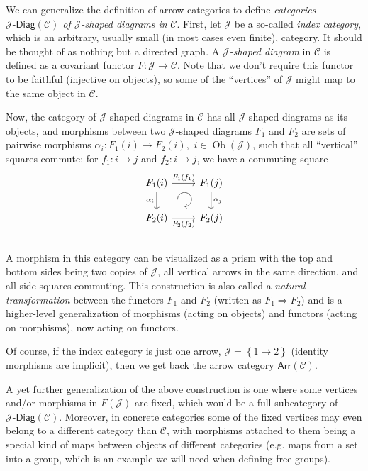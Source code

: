 \documentclass[english,letterpaper]{article}%
\numberwithin{equation}{section}
\numberwithin{figure}{section}
\numberwithin{table}{section}
\theoremstyle{definition}
\theoremstyle{definition}
\theoremstyle{definition}
\theoremstyle{plain}
\theoremstyle{plain}
\theoremstyle{plain}
\theoremstyle{plain}
\theoremstyle{remark}
\theoremstyle{remark}
\DeclareMathOperator{\ob}{Ob}
\begin{document}
\begin{defn}\label{categories of diagrams}
We can generalize the definition of arrow categories to define \emph{categories
$\mathcal{J}\text{-}\mathsf{Diag}\left(\mathcal{C}\right)$ of $\mathcal{J}$-shaped
diagrams in} $\mathcal{C}$. First, let $\mathcal{J}$ be a so-called \emph{index
category}, which is an arbitrary, usually small (in most cases even finite), category.
It should be thought of as nothing but a directed graph. A \emph{$\mathcal{J}$-shaped
diagram} in $\mathcal{C}$ is defined as a covariant functor $F:\mathcal{J}\to\mathcal{C}$.
Note that we don't require this functor to be faithful (injective
on objects), so some of the ``vertices'' of $\mathcal{J}$ might
map to the same object in $\mathcal{C}$.

Now, the category of $\mathcal{J}$-shaped diagrams in $\mathcal{C}$
has all $\mathcal{J}$-shaped diagrams as its objects, and morphisms
between two $\mathcal{J}$-shaped diagrams $F_{1}$ and $F_{2}$ are
sets of pairwise morphisms $\alpha_{i}:F_{1}\left(i\right)\to F_{2}\left(i\right),$
$i\in\ob\left(\mathcal{J}\right)$, such that all ``vertical'' squares
commute: for $f_{1}:i\to j$ and $f_{2}:i\to j$, we have a commuting
square\[\begin{tikzcd}[every matrix/.append style={name=m},   
execute at end picture={\draw [<-] ([xshift=-2.7em,yshift=.3em]m-2-2.north) arc[start angle=-90,delta angle=270,radius=0.25cm];}]
   F_1(i)\arrow[r,"F_1(f_1)" ]\arrow[d,swap,"\alpha_i" ]& F_1(j) \arrow[d,"\alpha_j" ] \\
   F_2(i)\arrow[r,swap,"F_2(f_2)" ]& F_2(j)\\
\end{tikzcd}\]A morphism in this category can be visualized as a prism with the
top and bottom sides being two copies of $\mathcal{J}$, all vertical
arrows in the same direction, and all side squares commuting. This
construction is also called a \emph{natural transformation} between
the functors $F_{1}$ and $F_{2}$ (written as $F_{1}\Longrightarrow F_{2}$)
and is a higher-level generalization of morphisms (acting on objects)
and functors (acting on morphisms), now acting on functors.

Of course, if the index category is just one arrow, $\mathcal{J}=\left\{ 1\to2\right\} $
(identity morphisms are implicit), then we get back the arrow category
$\mathsf{Arr}\left(\mathcal{C}\right)$.
\end{defn}
%
\begin{example}
A yet further generalization of the above construction is one where
some vertices and/or morphisms in $F\left(\mathcal{J}\right)$ are
fixed, which would be a full subcategory of $\mathcal{J}\text{-}\mathsf{Diag}\left(\mathcal{C}\right)$.
Moreover, in concrete categories some of the fixed vertices may even
belong to a different category than $\mathcal{C}$, with morphisms
attached to them being a special kind of maps between objects of different
categories (e.g. maps from a set into a group, which is an example
we will need when defining free groups).
\end{example}
\end{document}
